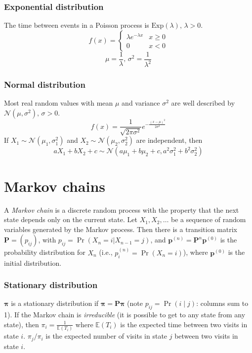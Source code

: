 \subsubsection{Exponential distribution}
The time between events in a Poisson process is $\textrm{Exp}(\lambda),\,\lambda>0$.
\[f(x) = \left\{
\begin{array}{cl}
\lambda e^{-\lambda x} & x\geq0\\
0 & x<0
\end{array}\right.\]
\[\mu=\frac{1}{\lambda},\,\sigma^2=\frac{1}{\lambda^2}\]

\subsubsection{Normal distribution}
Most real random values with mean $\mu$ and variance $\sigma^2$ are well described by $\mathcal{N}(\mu,\sigma^2),\,\sigma>0$.
\[ f(x) = \frac{1}{\sqrt{2\pi\sigma^2}}e^{-\frac{(x-\mu)^2}{2\sigma^2}} \]
If $X_1 \sim \mathcal{N}(\mu_1,\sigma_1^2)$ and $X_2 \sim \mathcal{N}(\mu_2,\sigma_2^2)$ are independent, then
\[ aX_1 + bX_2 + c \sim \mathcal{N}(a\mu_1+b\mu_2+c,a^2\sigma_1^2+b^2\sigma_2^2) \]

\section{Markov chains}
A \emph{Markov chain} is a discrete random process with the property that the next state depends only on the current state.
Let $X_1,X_2,\ldots$ be a sequence of random variables generated by the Markov process.
Then there is a transition matrix $\mathbf{P} = (p_{ij})$, with $p_{ij} = \Pr(X_n = i | X_{n-1} = j)$,
and $\mathbf{p}^{(n)} = \mathbf P^n \mathbf p^{(0)}$ is the probability distribution for $X_n$ (i.e., $p^{(n)}_i = \Pr(X_n = i)$),
where $\mathbf{p}^{(0)}$ is the initial distribution.

\subsubsection{Stationary distribution}
$\mathbf{\pi}$ is a stationary distribution if $\mathbf{\pi} = \mathbf{P \pi}$ (note $p_{ij} = \Pr(i \mid j)$: columns sum to 1).
If the Markov chain is \emph{irreducible} (it is possible to get to any state from any state),
then $\pi_i = \frac{1}{\mathbb{E}(T_i)}$ where $\mathbb{E}(T_i)$  is the expected time between two visits in state $i$.
$\pi_j/\pi_i$ is the expected number of visits in state $j$ between two visits in state $i$.

